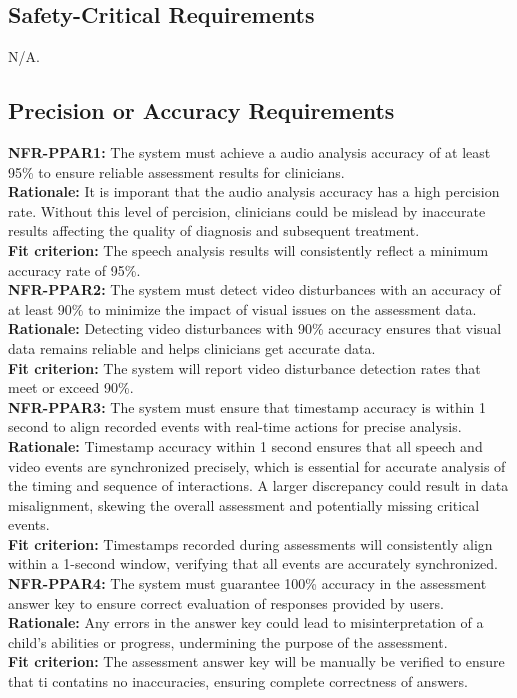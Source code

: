 \documentclass[12pt]{article}
\begin{document}
\subsection{Safety-Critical Requirements}
\color{red} N/A. \color{black}
\subsection{Precision or Accuracy Requirements}

\noindent\textbf{NFR-PPAR1: }The system must achieve a audio analysis accuracy of at least 95\% to ensure reliable assessment results for clinicians.\\
\textbf{Rationale: }It is imporant that the audio analysis accuracy has a high percision rate. Without this level of percision, clinicians could 
be mislead by inaccurate results affecting the quality of diagnosis and subsequent treatment.\\
\textbf{Fit criterion: }The speech analysis results will consistently reflect a minimum accuracy rate of 95\%.\\

\noindent\textbf{NFR-PPAR2: }The system must detect video disturbances with an accuracy of at least 90\% to minimize the impact of visual issues on the assessment data.\\
\textbf{Rationale: }Detecting video disturbances with 90\% accuracy ensures that visual data remains reliable and helps clinicians get accurate data.\\
\textbf{Fit criterion: }The system will report video disturbance detection rates that meet or exceed 90\%.\\

\noindent\textbf{NFR-PPAR3: }The system must ensure that timestamp accuracy is within 1 second to align recorded events with real-time actions for precise analysis.\\
\textbf{Rationale: }Timestamp accuracy within 1 second ensures that all speech and video events are synchronized precisely, which is essential for accurate analysis of the timing and sequence of interactions. A larger discrepancy could result in data misalignment, skewing the overall assessment and potentially missing critical events.\\
\textbf{Fit criterion: }Timestamps recorded during assessments will consistently align within a 1-second window, verifying that all events are accurately synchronized.\\

\noindent\textbf{NFR-PPAR4: }The system must guarantee 100\% accuracy in the assessment answer key to ensure correct evaluation of responses provided by users.\\
\textbf{Rationale: }Any errors in the answer key could lead to misinterpretation of a child’s abilities or progress, undermining the purpose of the assessment.\\
\textbf{Fit criterion: }The assessment answer key will be manually be verified to ensure that ti contatins no inaccuracies, ensuring complete correctness of answers.\\
\end{document}
